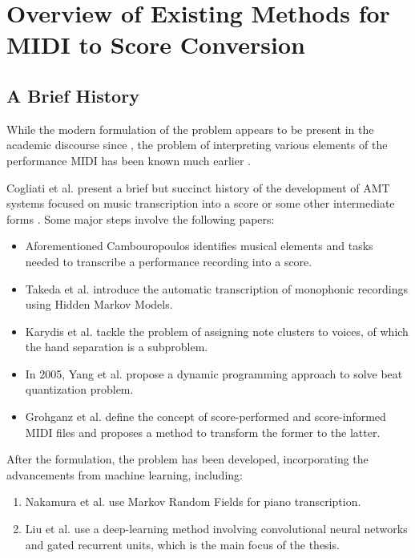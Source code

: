 \chapter{Overview of Existing Methods for MIDI to Score Conversion}

\section{A Brief History}

While the modern formulation of the problem appears to be present in the academic discourse since \cite{Cogliati2016}, the problem of interpreting various elements of the performance MIDI has been known much earlier \cite{Cambouropoulos2000}.

Cogliati et al. present a brief but succinct history of the development of AMT systems focused on music transcription into a score or some other intermediate forms \cite{Cogliati2016}. Some major steps involve the following papers:
\begin{itemize}
	\item Aforementioned Cambouropoulos \cite{Cambouropoulos2000} identifies musical elements and tasks needed to transcribe a performance recording into a score.
	\item Takeda et al. \cite{Takeda2002} introduce the automatic transcription of monophonic recordings using Hidden Markov Models.
	\item Karydis et al. \cite{Karydis2007} tackle the problem of assigning note clusters to voices, of which the hand separation is a subproblem.
	\item In 2005, Yang et al. \cite{Yang2005} propose a dynamic programming approach to solve beat quantization problem.
	\item Grohganz et al. \cite{Grohganz2014} define the concept of score-performed and score-informed MIDI files and proposes a method to transform the former to the latter.
\end{itemize}

After the formulation, the problem has been developed, incorporating the advancements from machine learning, including:
\begin{enumerate}
	\item Nakamura et al. \cite{Nakamura2017} use Markov Random Fields for piano transcription.
	\item Liu et al. \cite{Liu2022} use a deep-learning method involving convolutional neural networks and gated recurrent units, which is the main focus of the thesis.
\end{enumerate}

